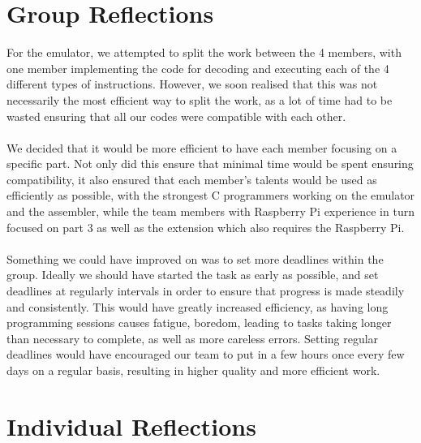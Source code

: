 \documentclass[11pt,twoside]{article}
\begin{document}
\section{Group Reflections}
For the emulator, we attempted to split the work between the 4 members, with one member implementing the code for decoding and executing each of the 4 different types of instructions. However, we soon realised that this was not necessarily the most efficient way to split the work, as a lot of time had to be wasted ensuring that all our codes were compatible with each other.\\\\
We decided that it would be more efficient to have each member focusing on a specific part. Not only did this ensure that minimal time would be spent ensuring compatibility, it also ensured that each member’s talents would be used as efficiently as possible, with the strongest C programmers working on the emulator and the assembler, while the team members with Raspberry Pi experience in turn focused on part 3 as well as the extension which also requires the Raspberry Pi.\\\\
Something we could have improved on was to set more deadlines within the group. Ideally we should have started the task as early as possible, and set deadlines at regularly intervals in order to ensure that progress is made steadily and consistently. This would have greatly increased efficiency, as having long programming sessions causes fatigue, boredom, leading to tasks taking longer than necessary to complete, as well as more careless errors. Setting regular deadlines would have encouraged our team to put in a few hours once every few days on a regular basis, resulting in higher quality and more efficient work.\\


\section{Individual Reflections}
\end{document}
